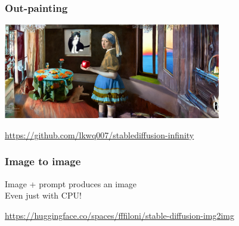 \documentclass[17pt,aspectratio=169,hyperref={pdfusetitle,colorlinks,allcolors=olive}]{beamer}
\begin{document}
\begin{frame}[fragile]
  \frametitle{Out-painting}

    \begin{center}
    \includegraphics[width=9.5cm]{figs/sd-infinity}
  \end{center}

  \begin{flushright}
    {\scriptsize
    \url{https://github.com/lkwq007/stablediffusion-infinity} \\
    }
  \end{flushright}


  
  
\end{frame}


\begin{frame}[fragile]
  \frametitle{Image to image}

  Image + prompt produces an image \\
  Even just with CPU! \\
  
  \begin{flushright}
    {\scriptsize
    \url{https://huggingface.co/spaces/fffiloni/stable-diffusion-img2img} \\
    }
  \end{flushright}
  
\end{frame}
\end{document}
